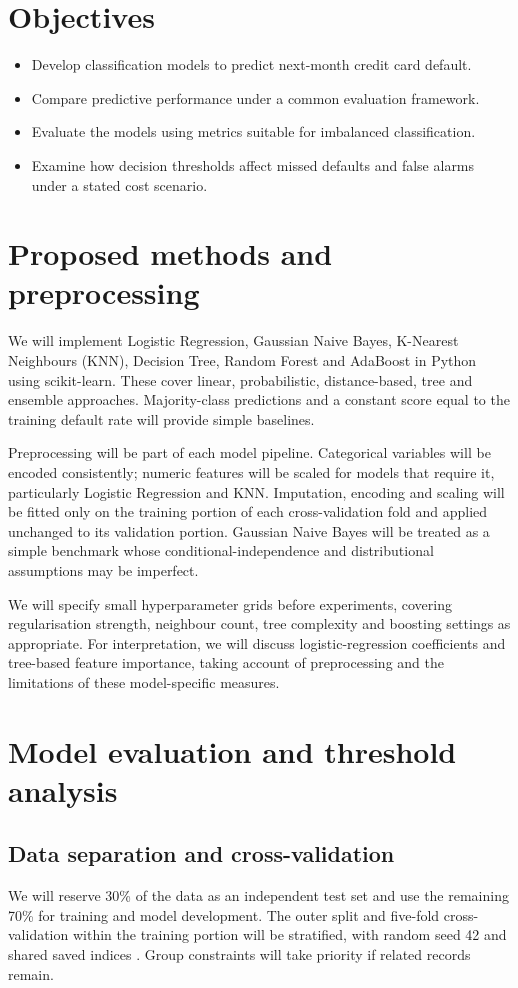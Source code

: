 \documentclass{article}
\begin{document}
\section{Objectives}
\begin{itemize}
  \item Develop classification models to predict next-month credit card default.
  \item Compare predictive performance under a common evaluation framework.
  \item Evaluate the models using metrics suitable for imbalanced classification.
  \item Examine how decision thresholds affect missed defaults and false alarms under a stated cost scenario.
\end{itemize}

\section{Proposed methods and preprocessing}
We will implement Logistic Regression, Gaussian Naive Bayes, K-Nearest Neighbours (KNN), Decision Tree, Random Forest and AdaBoost in Python using scikit-learn. These cover linear, probabilistic, distance-based, tree and ensemble approaches. Majority-class predictions and a constant score equal to the training default rate will provide simple baselines.

Preprocessing will be part of each model pipeline. Categorical variables will be encoded consistently; numeric features will be scaled for models that require it, particularly Logistic Regression and KNN. Imputation, encoding and scaling will be fitted only on the training portion of each cross-validation fold and applied unchanged to its validation portion. Gaussian Naive Bayes will be treated as a simple benchmark whose conditional-independence and distributional assumptions may be imperfect.

We will specify small hyperparameter grids before experiments, covering regularisation strength, neighbour count, tree complexity and boosting settings as appropriate. For interpretation, we will discuss logistic-regression coefficients and tree-based feature importance, taking account of preprocessing and the limitations of these model-specific measures.

\section{Model evaluation and threshold analysis}
\subsection{Data separation and cross-validation}
We will reserve 30\% of the data as an independent test set and use the remaining 70\% for training and model development. The outer split and five-fold cross-validation within the training portion will be stratified, with random seed 42 and shared saved indices \citep{cross_validation}. Group constraints will take priority if related records remain.
\end{document}
